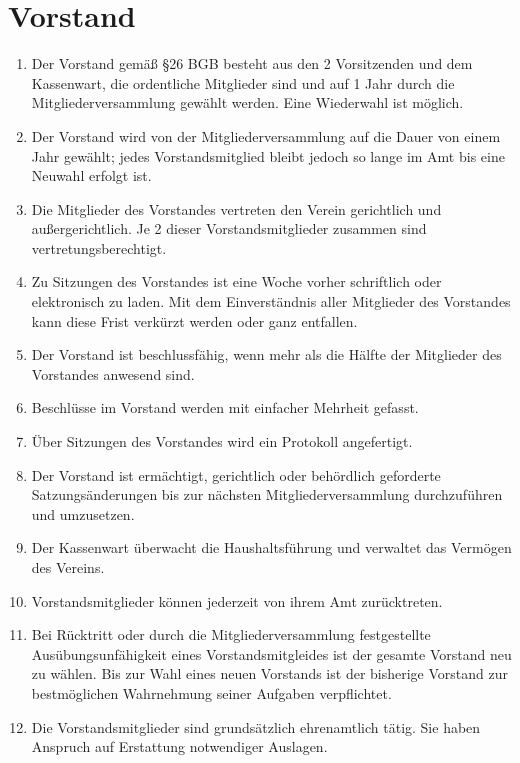 \documentclass[ngerman]{article}
\begin{document}
\section{Vorstand}
\begin{enumerate}
  \item Der Vorstand gemäß §26 BGB besteht aus den 2 Vorsitzenden und dem Kassenwart, die ordentliche Mitglieder sind und auf 1 Jahr durch die Mitgliederversammlung gewählt werden. Eine Wiederwahl ist möglich.
  \item Der Vorstand wird von der Mitgliederversammlung auf die Dauer von einem Jahr gewählt; jedes Vorstandsmitglied bleibt jedoch so lange im Amt bis eine Neuwahl erfolgt ist.
  \item Die Mitglieder des Vorstandes vertreten den Verein gerichtlich und außergerichtlich. Je 2 dieser Vorstandsmitglieder zusammen sind vertretungsberechtigt.
  \item Zu Sitzungen des Vorstandes ist eine Woche vorher schriftlich oder elektronisch zu laden. Mit dem Einverständnis aller Mitglieder des Vorstandes kann diese Frist verkürzt werden oder ganz entfallen.
  \item Der Vorstand ist beschlussfähig, wenn mehr als die Hälfte der Mitglieder des Vorstandes anwesend sind.
  \item Beschlüsse im Vorstand werden mit einfacher Mehrheit gefasst.
  \item Über Sitzungen des Vorstandes wird ein Protokoll angefertigt.
  \item Der Vorstand ist ermächtigt, gerichtlich oder behördlich geforderte Satzungsänderungen bis zur nächsten Mitgliederversammlung durchzuführen und umzusetzen.
  \item Der Kassenwart überwacht die Haushaltsführung und verwaltet das Vermögen des Vereins.
  \item Vorstandsmitglieder können jederzeit von ihrem Amt zurücktreten.
  \item Bei Rücktritt oder durch die Mitgliederversammlung festgestellte Ausübungsunfähigkeit eines Vorstandsmitgleides ist der gesamte Vorstand neu zu wählen. Bis zur Wahl eines neuen Vorstands ist der bisherige Vorstand zur bestmöglichen Wahrnehmung seiner Aufgaben verpflichtet.
  \item Die Vorstandsmitglieder sind grundsätzlich ehrenamtlich tätig. Sie haben Anspruch auf Erstattung notwendiger Auslagen.
\end{enumerate}
\end{document}

